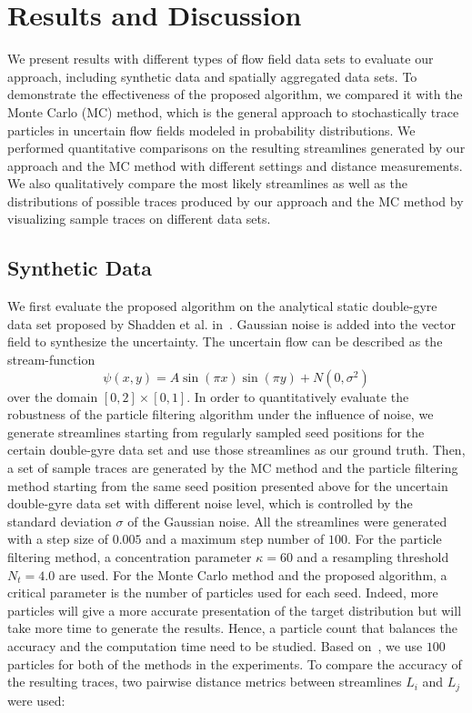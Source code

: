 \section{Results and Discussion}

We present results with different types of flow field data sets to evaluate our approach, including synthetic data and spatially aggregated data sets. To demonstrate the effectiveness of the proposed algorithm, we compared it with the Monte Carlo (MC) method, which is the general approach to stochastically trace particles in uncertain flow fields modeled in probability distributions. We performed quantitative comparisons on the resulting streamlines generated by our approach and the MC method with different settings and distance measurements. We also qualitatively compare the most likely streamlines as well as the distributions of possible traces produced by our approach and the MC method by visualizing sample traces on different data sets.

\subsection{Synthetic Data}

We first evaluate the proposed algorithm on the analytical static double-gyre data set proposed by Shadden et al. in~\cite{Shadden2005271}. Gaussian noise is added into the vector field to synthesize the uncertainty. The uncertain flow can be described as the stream-function
\begin{equation}
  \psi(x,y) = A\sin(\pi x)\sin(\pi y) + N(0,{\sigma ^2})
\end{equation}
over the domain $[0,2]\times[0,1]$. In order to quantitatively evaluate the robustness of the particle filtering algorithm under the influence of noise, we generate streamlines starting from regularly sampled seed positions for the certain double-gyre data set and use those streamlines as our ground truth. Then, a set of sample traces are generated by the MC method and the particle filtering method starting from the same seed position presented above for the uncertain double-gyre data set with different noise level, which is controlled by the standard deviation $\sigma$ of the Gaussian noise. All the streamlines were generated with a step size of $0.005$ and a maximum step number of $100$. For the particle filtering method, a concentration parameter $\kappa = 60$ and a resampling threshold $N_t = 4.0$ are used. For the Monte Carlo method and the proposed algorithm, a critical parameter is the number of particles used for each seed. Indeed, more particles will give a more accurate presentation of the target distribution but will take more time to generate the results. Hence, a particle count that balances the accuracy and the computation time need to be studied. Based on~\cite{journals/mia/PontabryROSKD13}, we use $100$ particles for both of the methods in the experiments. To compare the accuracy of the resulting traces, two pairwise distance metrics between streamlines $L_i$ and $L_j$ were used:


